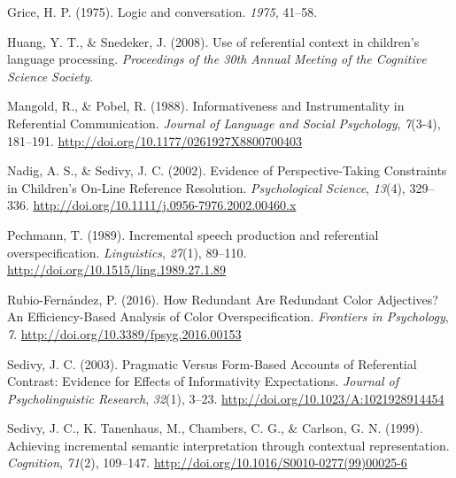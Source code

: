 \documentclass[10pt, letterpaper]{article}
\begin{document}
\hypertarget{ref-grice1975logic}{}
Grice, H. P. (1975). Logic and conversation. \emph{1975}, 41--58.

\hypertarget{ref-huangsnedeker2008}{}
Huang, Y. T., \& Snedeker, J. (2008). Use of referential context in
children's language processing. \emph{Proceedings of the 30th Annual
Meeting of the Cognitive Science Society}.

\hypertarget{ref-mangold_informativeness_1988}{}
Mangold, R., \& Pobel, R. (1988). Informativeness and Instrumentality in
Referential Communication. \emph{Journal of Language and Social
Psychology}, \emph{7}(3-4), 181--191.
\url{http://doi.org/10.1177/0261927X8800700403}

\hypertarget{ref-nadig_evidence_2002}{}
Nadig, A. S., \& Sedivy, J. C. (2002). Evidence of Perspective-Taking
Constraints in Children's On-Line Reference Resolution.
\emph{Psychological Science}, \emph{13}(4), 329--336.
\url{http://doi.org/10.1111/j.0956-7976.2002.00460.x}

\hypertarget{ref-pechmann_incremental_1989}{}
Pechmann, T. (1989). Incremental speech production and referential
overspecification. \emph{Linguistics}, \emph{27}(1), 89--110.
\url{http://doi.org/10.1515/ling.1989.27.1.89}

\hypertarget{ref-rubio-fernandez_how_2016}{}
Rubio-Fernández, P. (2016). How Redundant Are Redundant Color
Adjectives? An Efficiency-Based Analysis of Color Overspecification.
\emph{Frontiers in Psychology}, \emph{7}.
\url{http://doi.org/10.3389/fpsyg.2016.00153}

\hypertarget{ref-sedivy_pragmatic_2003-2}{}
Sedivy, J. C. (2003). Pragmatic Versus Form-Based Accounts of
Referential Contrast: Evidence for Effects of Informativity
Expectations. \emph{Journal of Psycholinguistic Research}, \emph{32}(1),
3--23. \url{http://doi.org/10.1023/A:1021928914454}

\hypertarget{ref-sedivy_achieving_1999}{}
Sedivy, J. C., K. Tanenhaus, M., Chambers, C. G., \& Carlson, G. N.
(1999). Achieving incremental semantic interpretation through contextual
representation. \emph{Cognition}, \emph{71}(2), 109--147.
\url{http://doi.org/10.1016/S0010-0277(99)00025-6}


\end{document}
